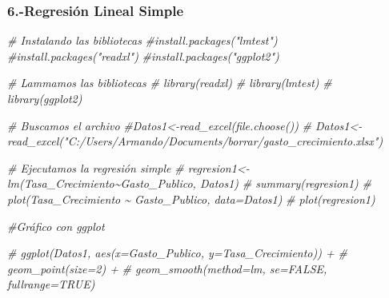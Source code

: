 \documentclass[
]{article}
\newenvironment{Shaded}{\begin{snugshade}}{\end{snugshade}}
\newcommand{\CommentTok}[1]{\textcolor[rgb]{0.56,0.35,0.01}{\textit{#1}}}
\newcommand{\DecValTok}[1]{\textcolor[rgb]{0.00,0.00,0.81}{#1}}
\newcommand{\NormalTok}[1]{#1}
\newcommand{\OtherTok}[1]{\textcolor[rgb]{0.56,0.35,0.01}{#1}}
\newcommand{\SpecialCharTok}[1]{\textcolor[rgb]{0.00,0.00,0.00}{#1}}
\newcommand{\StringTok}[1]{\textcolor[rgb]{0.31,0.60,0.02}{#1}}
\begin{document}
\begin{Shaded}
\end{Shaded}

\hypertarget{regresiuxf3n-lineal-simple}{%
\subsubsection{\texorpdfstring{6.-Regresión Lineal Simple
}{6.-Regresión Lineal Simple  }}\label{regresiuxf3n-lineal-simple}}

\begin{Shaded}
\begin{Highlighting}[]
\CommentTok{\# Instalando las bibliotecas}
\CommentTok{\#install.packages("lmtest")}
\CommentTok{\#install.packages("readxl")}
\CommentTok{\#install.packages("ggplot2")}

\CommentTok{\# Lammamos las bibliotecas}
\CommentTok{\# library(readxl)}
\CommentTok{\# library(lmtest)}
\CommentTok{\# library(ggplot2)}
\end{Highlighting}
\end{Shaded}

\begin{Shaded}
\begin{Highlighting}[]
\CommentTok{\# Buscamos el archivo}
\CommentTok{\#Datos1\textless{}{-}read\_excel(file.choose())}
\CommentTok{\# Datos1\textless{}{-}read\_excel("C:/Users/Armando/Documents/borrar/gasto\_crecimiento.xlsx")}

\CommentTok{\# Ejecutamos la regresión simple}
\CommentTok{\# regresion1\textless{}{-}lm(Tasa\_Crecimiento\textasciitilde{}Gasto\_Publico, Datos1)}
\CommentTok{\# summary(regresion1)}
\CommentTok{\# plot(Tasa\_Crecimiento \textasciitilde{} Gasto\_Publico, data=Datos1)}
\CommentTok{\# plot(regresion1)}
\end{Highlighting}
\end{Shaded}

\begin{Shaded}
\begin{Highlighting}[]
\CommentTok{\#Gráfico con ggplot}


\CommentTok{\# ggplot(Datos1, aes(x=Gasto\_Publico, y=Tasa\_Crecimiento)) +}
\CommentTok{\#   geom\_point(size=2) + }
\CommentTok{\#   geom\_smooth(method=lm, se=FALSE, fullrange=TRUE)}
\end{Highlighting}
\end{Shaded}
\end{document}
